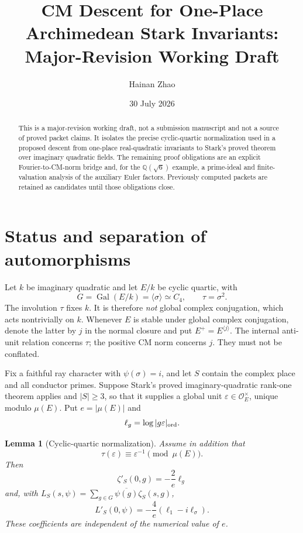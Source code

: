 \documentclass[11pt]{article}
\title{CM Descent for One-Place Archimedean Stark Invariants:\\
Major-Revision Working Draft}
\author{Hainan Zhao}
\date{30 July 2026}
\newtheorem{lemma}{Lemma}
\newcommand{\Q}{\mathbb Q}
\newcommand{\Gal}{\operatorname{Gal}}
\begin{document}
\maketitle

\begin{abstract}
This is a major-revision working draft, not a submission manuscript
and not a source of proved packet claims.  It isolates the precise
cyclic-quartic normalization used in a proposed descent from
one-place real-quadratic invariants to Stark's proved theorem over
imaginary quadratic fields.  The remaining proof obligations are an
explicit Fourier-to-CM-norm bridge and, for the
\(\Q(\sqrt6)\) example, a prime-ideal and finite-valuation analysis of
the auxiliary Euler factors.  Previously computed packets are retained
as candidates until those obligations close.
\end{abstract}

\section{Status and separation of automorphisms}

Let \(k\) be imaginary quadratic and let \(E/k\) be cyclic quartic,
with
\[
 G=\Gal(E/k)=\langle\sigma\rangle\simeq C_4,\qquad
 \tau=\sigma^2.
\]
The involution \(\tau\) fixes \(k\).  It is therefore \emph{not}
global complex conjugation, which acts nontrivially on \(k\).
Whenever \(E\) is stable under global complex conjugation, denote the
latter by \(j\) in the normal closure and put \(E^+=E^{\langle j\rangle}\).
The internal anti-unit relation concerns \(\tau\); the positive CM
norm concerns \(j\).  They must not be conflated.

Fix a faithful ray character with
\(\psi(\sigma)=i\), and let \(S\) contain the complex place and all
conductor primes.  Suppose Stark's proved imaginary-quadratic
rank-one theorem applies and \(|S|\ge3\), so that it supplies a global
unit \(\varepsilon\in\mathcal O_E^\times\), unique modulo
\(\mu(E)\).  Put \(e=|\mu(E)|\) and
\[
 \ell_g=\log|g\varepsilon|_{\rm ord}.
\]

\begin{lemma}[Cyclic-quartic normalization]\label{lem:norm}
Assume in addition that
\[
 \tau(\varepsilon)\equiv\varepsilon^{-1}\pmod{\mu(E)}.
\tag{1}
\]
Then
\[
 \zeta'_S(0,g)=-\frac2e\ell_g
\tag{2}
\]
and, with \(L_S(s,\psi)=\sum_{g\in G}\overline{\psi(g)}
\zeta_S(s,g)\),
\[
 L'_S(0,\psi)=-\frac4e(\ell_1-i\ell_\sigma).
\tag{3}
\]
These coefficients are independent of the numerical value of \(e\).
\end{lemma}
\end{document}
